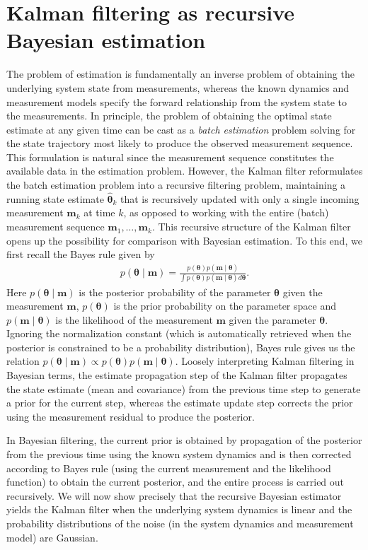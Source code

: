 \documentclass{resonance}
\def\th{\bm{\theta}}
\def\thh{\bm{\hat{\theta}}}
\def\m{\bm{m}}
\begin{document}
\section{Kalman filtering as recursive Bayesian estimation}
The problem of estimation is fundamentally an inverse problem
of obtaining the underlying system state from measurements,
whereas the known dynamics and measurement models specify the
forward relationship from the system state to the measurements.
In principle, the problem of obtaining the optimal state estimate
at any given time can be cast as a \emph{batch estimation} problem
solving for the state trajectory most likely to produce the observed
measurement sequence. This formulation is natural since the measurement sequence
constitutes the available data in the estimation problem.
However, the Kalman filter reformulates the batch estimation problem
into a recursive filtering problem, 
maintaining a running state estimate $\thh_k$ 
that is recursively updated with only a single incoming measurement $\m_k$ at 
time $k$, as opposed to working with
the entire (batch) measurement sequence $\m_1, \ldots, \m_k$.
This recursive structure of the Kalman filter opens up the
possibility for comparison with Bayesian estimation.
To this end, we first recall the Bayes rule given by
\begin{align*}
    p \left( \th \; | \; \m \right) = \frac{p \left( \th \right) p \left( \m  \; | \; \th \right)}{\int p \left( \th \right) p \left( \m  \; | \; \th \right) d\th }.
\end{align*}
Here $p \left( \th \; | \; \m \right)$ is the posterior probability
of the parameter $\th$ given the measurement $\m$, $p(\th)$ is the
prior probability on the parameter space and $p\left( \m  \; | \; \th \right)$ is the likelihood of the measurement $\m$ given the parameter $\th$.
Ignoring the normalization constant (which is automatically retrieved 
when the posterior is constrained to be a probability distribution), Bayes rule gives us the relation $p \left( \th \; | \; \m \right) \propto p \left( \th \right) p \left( \m  \; | \; \th \right)$.
Loosely interpreting Kalman filtering in Bayesian terms, the estimate propagation step of the Kalman filter propagates the state estimate (mean and covariance) from the previous time step to generate a 
prior for the current step, whereas the estimate update step
corrects the prior using the measurement residual to produce 
the posterior.

In Bayesian filtering, the current prior is obtained by propagation 
of the posterior from the previous time using the known system dynamics 
and is then corrected according to Bayes rule (using the current measurement and the likelihood function) to obtain the
current posterior, and the entire process is carried out recursively.
We will now show precisely that the recursive Bayesian estimator yields the Kalman filter when the underlying system dynamics is linear and the probability distributions of the noise (in the system dynamics and measurement model) are Gaussian.
\end{document}

